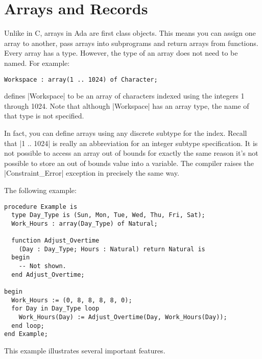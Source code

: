 \section{Arrays and Records}

Unlike in C, arrays in Ada are first class objects. This means you can assign one array to
another, pass arrays into subprograms and return arrays from functions. Every array has a type.
However, the type of an array does not need to be named. For example:

\begin{lstlisting}
Workspace : array(1 .. 1024) of Character;
\end{lstlisting}

\noindent defines |Workspace| to be an array of characters indexed using the integers 1 through
1024. Note that although |Workspace| has an array type, the name of that type is not specified.

In fact, you can define arrays using any discrete subtype for the index. Recall that |1 .. 1024|
is really an abbreviation for an integer subtype specification. It is not possible to access an
array out of bounds for exactly the same reason it's not possible to store an out of bounds
value into a variable. The compiler raises the |Constraint_Error| exception in precisely the
same way.

The following example:

\begin{lstlisting}
procedure Example is
  type Day_Type is (Sun, Mon, Tue, Wed, Thu, Fri, Sat);
  Work_Hours : array(Day_Type) of Natural;

  function Adjust_Overtime
    (Day : Day_Type; Hours : Natural) return Natural is
  begin
    -- Not shown.
  end Adjust_Overtime;

begin
  Work_Hours := (0, 8, 8, 8, 8, 0);
  for Day in Day_Type loop
    Work_Hours(Day) := Adjust_Overtime(Day, Work_Hours(Day));
  end loop;
end Example;
\end{lstlisting}

This example illustrates several important features.

